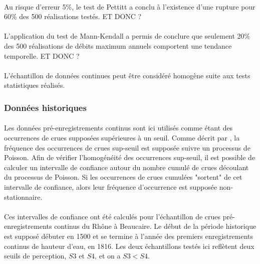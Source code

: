 \documentclass[11pt]{article}
\begin{document}
	\paragraph{} Au risque d'erreur 5\%, le test de Pettitt a conclu à l'existence d'une rupture pour 60\% des 500 réalisations testés. ET DONC ?
	
	\paragraph{} L'application du test de Mann-Kendall a permis de conclure que seulement 20\% des 500 réalisations de débits maximum annuels comportent une tendance temporelle. ET DONC ?
	
	\paragraph{} L'échantillon de données continues peut être considéré homogène suite aux tests statistiques réalisés. 
	
		
	\subsubsection{Données historiques}
	
	\paragraph{} Les données pré-enregistrements continus sont ici utilisés comme étant des occurrences de crues supposées supérieures à un seuil. Comme décrit par \citet{lang_towards_1999}, la fréquence des occurrences de crues sup-seuil est supposée suivre un processus de Poisson. Afin de vérifier l'homogénéité des occurrences sup-seuil, il est possible de calculer un intervalle de confiance autour du nombre cumulé de crues découlant du processus de Poisson. Si les occurrences de crues cumulées "sortent" de cet intervalle de confiance, alors leur fréquence d'occurrence est supposée non-stationnaire. 
	
	\paragraph{} Ces intervalles de confiance ont été calculés pour l'échantillon de crues pré-enregistrements continus du Rhône à Beaucaire. Le début de la période historique est supposé débuter en 1500 et se termine à l'année des premiers enregistrements continus de hauteur d'eau, en 1816. Les deux échantillons testés ici reflètent deux seuils de perception, $S3$ et $S4$, et on a $S3 < S4$. 
\end{document}
